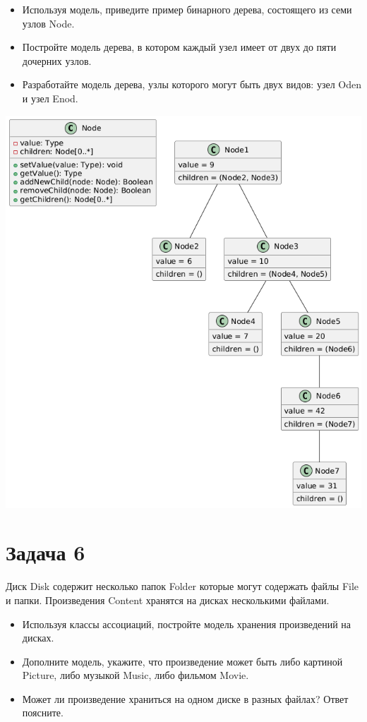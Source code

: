 \documentclass{article}
\begin{document}
\begin{itemize}
    \item Используя модель, приведите пример бинарного дерева, состоящего из семи узлов Node.
    \item Постройте модель дерева, в котором каждый узел имеет от двух до пяти дочерних узлов.
    \item Разработайте модель дерева, узлы которого могут быть двух видов: узел Oden и узел Enod.
\end{itemize}

\includegraphics[width=\textwidth]{5.png}

\section{Задача 6}
Диск Disk содержит несколько папок Folder которые могут содержать файлы File и папки. Произведения Content хранятся на дисках несколькими файлами.

\begin{itemize}
    \item Используя классы ассоциаций, постройте модель хранения произведений на дисках.
    \item Дополните модель, укажите, что произведение может быть либо картиной Picture, либо музыкой Music, либо фильмом Movie.
    \item Может ли произведение храниться на одном диске в разных файлах? Ответ поясните.
\end{itemize}
\end{document}
